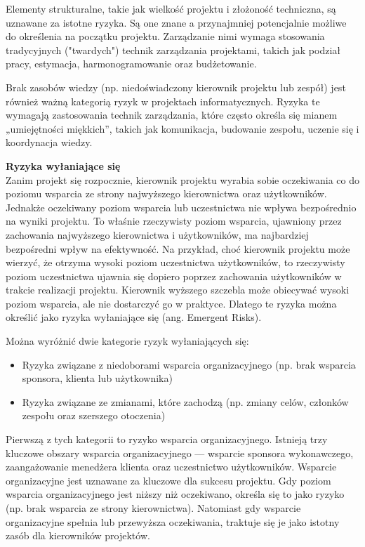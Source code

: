Elementy strukturalne, takie jak wielkość projektu i złożoność techniczna, są uznawane za istotne ryzyka. \autocite{mcfarlan}\autocite{zmud} Są one znane a przynajmniej potencjalnie możliwe do określenia na początku projektu. Zarządzanie nimi wymaga stosowania tradycyjnych ("twardych") technik zarządzania projektami, takich jak podział pracy, estymacja, harmonogramowanie oraz budżetowanie.

Brak zasobów wiedzy (np. niedoświadczony kierownik projektu lub zespół) jest również ważną kategorią ryzyk w projektach informatycznych. \autocite{mcfarlan}\autocite{barki} Ryzyka te wymagają zastosowania technik zarządzania, które często określa się mianem „umiejętności miękkich”, takich jak komunikacja, budowanie zespołu, uczenie się i koordynacja wiedzy. 

\textbf{Ryzyka wyłaniające się}\\
Zanim projekt się rozpocznie, kierownik projektu wyrabia sobie oczekiwania co do poziomu wsparcia ze strony najwyższego kierownictwa oraz użytkowników. Jednakże oczekiwany poziom wsparcia lub uczestnictwa nie wpływa bezpośrednio na wyniki projektu. To właśnie rzeczywisty poziom wsparcia, ujawniony przez zachowania najwyższego kierownictwa i użytkowników, ma najbardziej bezpośredni wpływ na efektywność. \autocite{chaos} Na przykład, choć kierownik projektu może wierzyć, że otrzyma wysoki poziom uczestnictwa użytkowników, to rzeczywisty poziom uczestnictwa ujawnia się dopiero poprzez zachowania użytkowników w trakcie realizacji projektu. Kierownik wyższego szczebla może obiecywać wysoki poziom wsparcia, ale nie dostarczyć go w praktyce. Dlatego te ryzyka można określić jako ryzyka wyłaniające się (ang. Emergent Risks).

Można wyróżnić dwie kategorie ryzyk wyłaniających się:
\begin{itemize}
    \item Ryzyka związane z niedoborami wsparcia organizacyjnego (np. brak wsparcia sponsora, klienta lub użytkownika)
    \item Ryzyka związane ze zmianami, które zachodzą (np. zmiany celów, członków zespołu oraz szerszego otoczenia)
\end{itemize} \autocite{ryzyka}

Pierwszą z tych kategorii to ryzyko wsparcia organizacyjnego. Istnieją trzy kluczowe obszary wsparcia organizacyjnego — wsparcie sponsora wykonawczego, zaangażowanie menedżera klienta oraz uczestnictwo użytkowników. Wsparcie organizacyjne jest uznawane za kluczowe dla sukcesu projektu. Gdy poziom wsparcia organizacyjnego jest niższy niż oczekiwano, określa się to jako ryzyko (np. brak wsparcia ze strony kierownictwa). Natomiast gdy wsparcie organizacyjne spełnia lub przewyższa oczekiwania, traktuje się je jako istotny zasób dla kierowników projektów. \autocite{keil}\autocite{sharma}\autocite{yetton}


